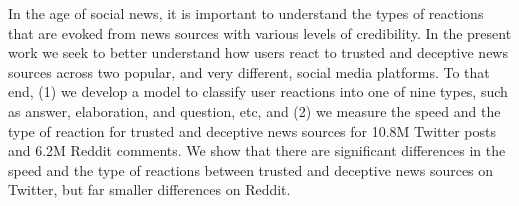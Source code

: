 In the age of social news, it is important to understand the types of reactions that are evoked from news sources with various levels of credibility. In the present work we seek to better understand how users react to trusted and deceptive news sources across two popular, and very different, social media platforms. To that end, (1) we develop a model to classify user reactions into one of nine types, such as answer, elaboration, and question, etc, and (2) we measure the speed and the type of reaction for trusted and deceptive news sources for 10.8M Twitter posts and 6.2M Reddit comments. We show that there are significant differences in the speed and the type of reactions between trusted and deceptive news sources on Twitter, but far smaller differences on Reddit.
